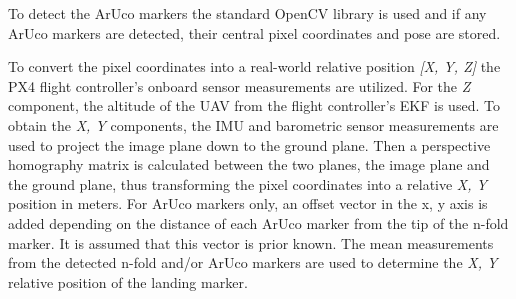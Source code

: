 \documentclass[conference]{IEEEtran}
\begin{document}

%
To detect the ArUco markers the standard OpenCV library is used and if
any ArUco markers are detected, their central pixel coordinates and
pose are stored.
 
To convert the pixel coordinates into a real-world relative position \emph{[X, Y, Z]} the PX4 flight controller's onboard sensor measurements are utilized. For the \emph{Z} component, the altitude of the UAV from the flight controller's EKF is used. To obtain the \emph{X, Y} components, the IMU and barometric sensor measurements are used to project the image plane down to the ground plane. Then a perspective homography matrix is calculated between the two planes, the image plane and the ground plane, thus transforming the pixel coordinates into a relative \emph{X, Y} position in meters. For ArUco markers only, an offset vector in the x, y axis is added depending on the distance of each ArUco marker from the tip of the n-fold marker. 
It is assumed that this vector is prior known. The mean measurements from the detected n-fold and/or ArUco markers are used to determine the \emph{X, Y} relative position of the landing marker.
\end{document}
